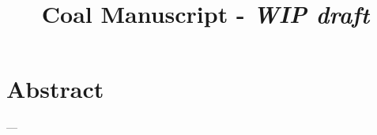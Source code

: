 \documentclass{article}
\title{Coal Manuscript - \textit{WIP draft}}
\author{}
\date{}
\begin{document}
\maketitle



% 
% 
\section*{Abstract}
---




















\end{document}
